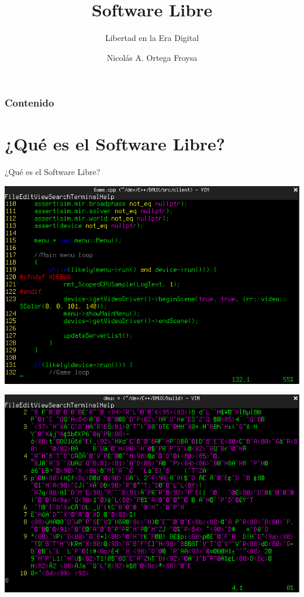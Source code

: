 \documentclass[xetex, mathserif, serif]{beamer}
\title{Software Libre}
\subtitle{Libertad en la Era Digital}
\author{Nicolás A. Ortega Froysa}
\institute{Universidad de Jáen}
\date{} %
\begin{document}
\frame{\titlepage}


\begin{frame}
    \frametitle{Contenido}
    \tableofcontents
\end{frame}


\section{¿Qué es el Software Libre?}
\begin{frame}
    \centering \Huge ¿Qué es el Software Libre?
\end{frame}


\begin{frame}
    \centering
    \includegraphics[scale=0.4]{imgs/source}
\end{frame}


\begin{frame}
    \centering
    \includegraphics[scale=0.4]{imgs/binary}
\end{frame}
\end{document}

